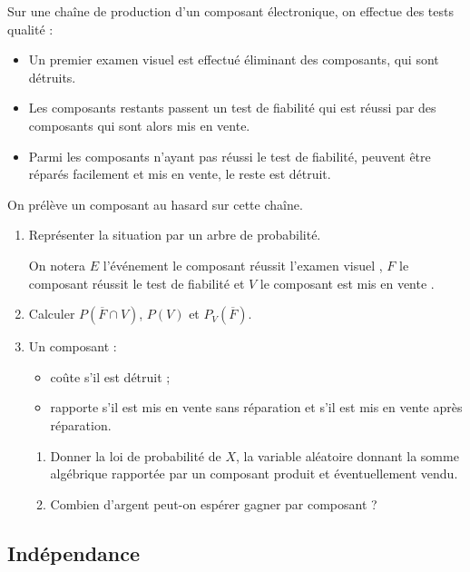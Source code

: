 \documentclass[12pt,a4paper,french]{article}
\begin{document}
\begin{question}
    Sur une chaîne de production d'un composant électronique, on effectue des tests qualité :
  \begin{itemize}
    \item Un premier examen visuel est effectué éliminant  des composants, qui sont détruits.
    \item Les composants restants passent un test de fiabilité qui est réussi par  des composants qui sont alors mis en vente.
    \item Parmi les composants n'ayant pas réussi le test de fiabilité,  peuvent être réparés facilement et mis en vente, le reste est détruit.
  \end{itemize}
  On prélève un composant au hasard sur cette chaîne.
  \begin{enumerate}
    \item Représenter la situation par un arbre de probabilité.

      On notera $E$ l'événement \og le composant réussit l'examen
      visuel \fg{}, $F$ \og le composant réussit le test de fiabilité
      \fg{} et $V$ \og le composant est mis en vente \fg{}.
    \item Calculer $P\left(\overline{F}\cap V\right)$, $P(V)$ et
      $P_V\left(\overline{F}\right)$.
    \item Un composant :
        \begin{itemize}
        \item coûte  s'il est détruit ;
        \item rapporte  s'il est mis en vente sans
          réparation et  s'il est mis en vente après
          réparation.
        \end{itemize}
        \vspace{-\baselineskip}\begin{enumerate}
        \item Donner la loi de probabilité de $X$, la variable
          aléatoire donnant la somme algébrique rapportée par un
          composant produit et éventuellement vendu.
        \item Combien d'argent peut-on \og espérer \fg{} gagner par
          composant ?
        \end{enumerate}
  \end{enumerate}
\end{question}

\subsection{Indépendance}
\end{document}
